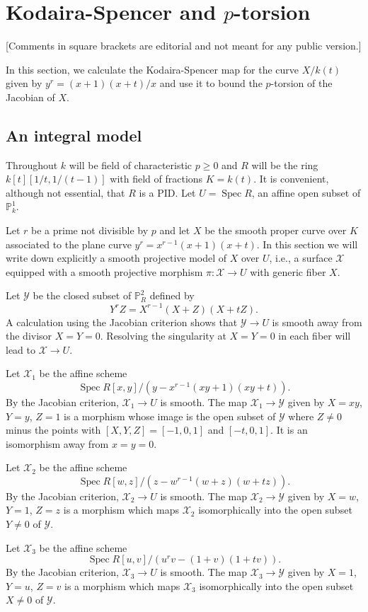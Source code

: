 \documentclass[reqno]{amsart}
\theoremstyle{definition}
\theoremstyle{remark}
\def\XX{\mathcal{X}}
\def\YY{\mathcal{Y}}
\def\P{\mathbb{P}}
\DeclareMathOperator{\spec}{Spec}
\begin{document}
\section{Kodaira-Spencer and $p$-torsion}

[Comments in square brackets are editorial and not meant for any
public version.]

In this section, we calculate the Kodaira-Spencer map for the curve
$X/k(t)$ given by $y^r=(x+1)(x+t)/x$ and use it to bound the
$p$-torsion of the Jacobian of $X$.

\subsection{An integral model}\label{s:model}
Throughout $k$ will be field of characteristic $p\ge0$ and $R$ will be
the ring $k[t][1/t,1/(t-1)]$ with field of fractions $K=k(t)$. It is
convenient, although not essential, that $R$ is a PID.  
Let $U=\spec R$, an affine open subset of $\P^1_k$.

Let $r$ be a prime not divisible by $p$ and let $X$ be the smooth
proper curve over $K$ associated to the plane curve
$y^r=x^{r-1}(x+1)(x+t)$. In this section we will write down explicitly
a smooth projective model of $X$ over $U$, i.e., a surface $\XX$
equipped with a smooth projective morphism $\pi:\XX\to U$ with generic
fiber $X$.

Let $\YY$ be the closed subset of $\P^2_R$ defined by
$$Y^rZ=X^{r-1}(X+Z)(X+tZ).$$
A calculation using the Jacobian criterion shows that $\YY\to U$ is
smooth away from the divisor $X=Y=0$. Resolving the singularity at
$X=Y=0$ in each fiber will lead to $\XX\to U$.

Let $\XX_1$ be the affine scheme
$$\spec R[x,y]/\left(y-x^{r-1}(xy+1)(xy+t)\right).$$
By the Jacobian criterion, $\XX_1\to U$ is smooth. The map
$\XX_1\to\YY$ given by $X=xy$, $Y=y$, $Z=1$ is a morphism whose image
is the open subset of $\YY$ where $Z\neq0$ minus the points with
$[X,Y,Z]=[-1,0,1]$ and $[-t,0,1]$. It is an isomorphism away from
$x=y=0$. 

Let $\XX_2$ be the affine scheme
$$\spec R[w,z]/\left(z-w^{r-1}(w+z)(w+tz)\right).$$
By the Jacobian criterion, $\XX_2\to U$ is smooth.  The map
$\XX_2\to\YY$ given by $X=w$, $Y=1$, $Z=z$ is a morphism which maps
$\XX_2$ isomorphically into the open subset $Y\neq0$ of $\YY$.

Let $\XX_3$ be the affine scheme
$$\spec R[u,v]/\left(u^rv-(1+v)(1+tv)\right).$$
By the Jacobian criterion, $\XX_3\to U$ is smooth.  The map
$\XX_3\to\YY$ given by $X=1$, $Y=u$, $Z=v$ is a morphism which maps
$\XX_3$ isomorphically into the open subset $X\neq0$ of $\YY$.
\end{document}
